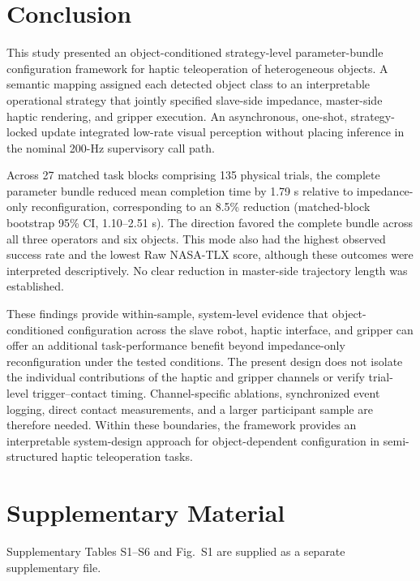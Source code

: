 \section{Conclusion}
This study presented an object-conditioned strategy-level parameter-bundle configuration framework for haptic teleoperation of heterogeneous objects. A semantic mapping assigned each detected object class to an interpretable operational strategy that jointly specified slave-side impedance, master-side haptic rendering, and gripper execution. An asynchronous, one-shot, strategy-locked update integrated low-rate visual perception without placing inference in the nominal 200-Hz supervisory call path.

Across 27 matched task blocks comprising 135 physical trials, the complete parameter bundle reduced mean completion time by 1.79 s relative to impedance-only reconfiguration, corresponding to an 8.5\% reduction (matched-block bootstrap 95\% CI, 1.10--2.51 s). The direction favored the complete bundle across all three operators and six objects. This mode also had the highest observed success rate and the lowest Raw NASA-TLX score, although these outcomes were interpreted descriptively. No clear reduction in master-side trajectory length was established.

These findings provide within-sample, system-level evidence that object-conditioned configuration across the slave robot, haptic interface, and gripper can offer an additional task-performance benefit beyond impedance-only reconfiguration under the tested conditions. The present design does not isolate the individual contributions of the haptic and gripper channels or verify trial-level trigger--contact timing. Channel-specific ablations, synchronized event logging, direct contact measurements, and a larger participant sample are therefore needed. Within these boundaries, the framework provides an interpretable system-design approach for object-dependent configuration in semi-structured haptic teleoperation tasks.


\section*{Supplementary Material}
Supplementary Tables S1--S6 and Fig.~S1 are supplied as a separate supplementary file.
